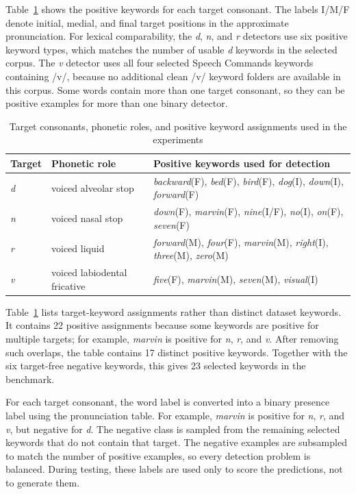 \documentclass[conference]{IEEEtran}
\begin{document}
Table~\ref{tab:targets} shows the positive keywords for each target consonant. The labels I/M/F denote initial, medial, and final target positions in the approximate pronunciation. For lexical comparability, the \textit{d}, \textit{n}, and \textit{r} detectors use six positive keyword types, which matches the number of usable \textit{d} keywords in the selected corpus. The \textit{v} detector uses all four selected Speech Commands keywords containing /v/, because no additional clean /v/ keyword folders are available in this corpus. Some words contain more than one target consonant, so they can be positive examples for more than one binary detector.

\begin{table}[t]
    \centering
    \caption{Target consonants, phonetic roles, and positive keyword assignments used in the experiments}
    \label{tab:targets}
    \begin{tabular}{p{1.2cm}p{3.0cm}p{11.2cm}}
        \toprule
        Target & Phonetic role & Positive keywords used for detection \\
        \midrule
        \textit{d} & voiced alveolar stop & \textit{backward}(F), \textit{bed}(F), \textit{bird}(F), \textit{dog}(I), \textit{down}(I), \textit{forward}(F) \\
        \textit{n} & voiced nasal stop & \textit{down}(F), \textit{marvin}(F), \textit{nine}(I/F), \textit{no}(I), \textit{on}(F), \textit{seven}(F) \\
        \textit{r} & voiced liquid & \textit{forward}(M), \textit{four}(F), \textit{marvin}(M), \textit{right}(I), \textit{three}(M), \textit{zero}(M) \\
        \textit{v} & voiced labiodental fricative & \textit{five}(F), \textit{marvin}(M), \textit{seven}(M), \textit{visual}(I) \\
        \bottomrule
    \end{tabular}
\end{table}

Table~\ref{tab:targets} lists target-keyword assignments rather than distinct dataset keywords. It contains 22 positive assignments because some keywords are positive for multiple targets; for example, \textit{marvin} is positive for \textit{n}, \textit{r}, and \textit{v}. After removing such overlaps, the table contains 17 distinct positive keywords. Together with the six target-free negative keywords, this gives 23 selected keywords in the benchmark.

For each target consonant, the word label is converted into a binary presence label using the pronunciation table. For example, \textit{marvin} is positive for \textit{n}, \textit{r}, and \textit{v}, but negative for \textit{d}. The negative class is sampled from the remaining selected keywords that do not contain that target. The negative examples are subsampled to match the number of positive examples, so every detection problem is balanced. During testing, these labels are used only to score the predictions, not to generate them.
\end{document}
